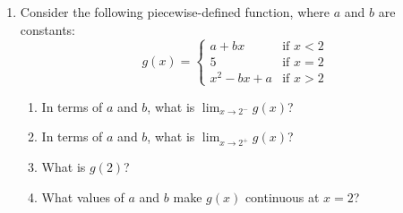 \documentclass[12pt]{exam}
\begin{document}
\begin{enumerate}
\begin{enumerate}
\begin{enumerate}

\item Compute $f(0)$ and $f(1)$.

\vspace{1.75in}

\item For each of the values $a=0$ and $a=1$, compute $\displaystyle\lim_{x\to a^-}f(x)$ and $\displaystyle\lim_{x\to a^+}f(x)$.

\vspace{2.25in}

\item Based on your work above, is $f$ continuous at $a=0$? How about at $a=1$? (Why?)

\vspace{1.75in}

\end{enumerate}

\newpage

\item Consider the following piecewise-defined function, where $a$ and $b$ are constants:
$$g(x)=\begin{cases} a+bx &\text{if $x<2$}\\[3pt] 5 &\text{if $x=2$}\\[3pt] x^2-bx+a &\text{if $x>2$}\end{cases}$$

\begin{enumerate}

\item In terms of $a$ and $b$, what is $\displaystyle\lim_{x\to 2^-}g(x)$?

\vspace{1in}

\item In terms of $a$ and $b$, what is $\displaystyle\lim_{x\to 2^+}g(x)$?

\vspace{1in}

\item What is $g(2)$?

\vspace{1in}

\item What values of $a$ and $b$ make $g(x)$ continuous at $x=2$?

\vspace{1in}

\end{enumerate}


\end{enumerate}
\end{enumerate}
\end{document}
